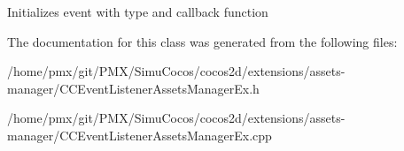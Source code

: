 Initializes event with type and callback function 

The documentation for this class was generated from the following files\+:\begin{DoxyCompactItemize}
\item 
/home/pmx/git/\+P\+M\+X/\+Simu\+Cocos/cocos2d/extensions/assets-\/manager/C\+C\+Event\+Listener\+Assets\+Manager\+Ex.\+h\item 
/home/pmx/git/\+P\+M\+X/\+Simu\+Cocos/cocos2d/extensions/assets-\/manager/C\+C\+Event\+Listener\+Assets\+Manager\+Ex.\+cpp\end{DoxyCompactItemize}
